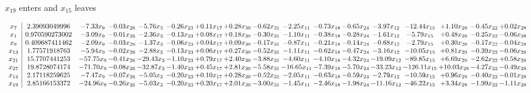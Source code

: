 \documentclass[9pt]{article}
\begin{document}
 $ x_{19} $ enters and $ x_{15} $ leaves 

 \[\begin{array}{c| c c@{\hskip 2pt} c@{\hskip 2pt} c@{\hskip 2pt} c@{\hskip 2pt} c@{\hskip 2pt} c@{\hskip 2pt} c@{\hskip 2pt} c@{\hskip 2pt} c@{\hskip 2pt} c@{\hskip 2pt} c@{\hskip 2pt} c@{\hskip 2pt} c@{\hskip 2pt} c@{\hskip 2pt} c@{\hskip 2pt} }
 x_{7}   &  2.39093049996 & -7.33 x_{9} & -0.03 x_{26} & -5.76 x_{3} & -0.26 x_{23} & +  0.11 x_{17} & +  0.28 x_{30} & -0.62 x_{31} & -2.25 x_{11} & -0.73 x_{18} & -0.65 x_{24} & -3.97 x_{12} & -12.44 x_{15} & +  1.10 x_{29} & -0.45 x_{22} & +  0.02 x_{28}\\
 x_{1}   &  0.970590273002 & -3.09 x_{9} & -0.01 x_{26} & -2.36 x_{3} & -0.13 x_{23} & +  0.08 x_{17} & +  0.18 x_{30} & -0.30 x_{31} & -1.10 x_{11} & -0.38 x_{18} & -0.28 x_{24} & -1.61 x_{12} & -5.79 x_{15} & +  0.48 x_{29} & -0.25 x_{22} & -0.06 x_{28}\\
 x_{8}   &  0.409687411462 & -2.09 x_{9} & -0.03 x_{26} & -1.37 x_{3} & -0.06 x_{23} & +  0.04 x_{17} & +  0.09 x_{30} & -0.17 x_{31} & -0.87 x_{11} & -0.21 x_{18} & -0.14 x_{24} & -0.68 x_{12} & -2.79 x_{15} & +  0.30 x_{29} & -0.17 x_{22} & -0.04 x_{28}\\
 x_{13}   &  1.77571918763 & -5.94 x_{9} & -0.02 x_{26} & -2.88 x_{3} & -0.13 x_{23} & +  0.06 x_{17} & +  0.27 x_{30} & -0.52 x_{31} & -1.11 x_{11} & -0.62 x_{18} & -0.47 x_{24} & -3.16 x_{12} & -10.05 x_{15} & +  0.81 x_{29} & -0.39 x_{22} & -0.06 x_{28}\\
 x_{21}   &  15.7707441253 & -57.75 x_{9} & -0.41 x_{26} & -29.43 x_{3} & -1.10 x_{23} & +  0.79 x_{17} & +  2.40 x_{30} & -3.88 x_{31} & -4.60 x_{11} & -4.10 x_{18} & -4.32 x_{24} & -19.09 x_{12} & -89.85 x_{15} & +  6.69 x_{29} & -2.62 x_{22} & +  0.58 x_{28}\\
 x_{27}   &  19.8728074174 & -71.70 x_{9} & -0.08 x_{26} & -32.87 x_{3} & -1.40 x_{23} & +  0.45 x_{17} & +  2.81 x_{30} & -5.58 x_{31} & -16.65 x_{11} & -7.39 x_{18} & -5.70 x_{24} & -33.23 x_{12} & -126.11 x_{15} & + 10.03 x_{29} & -4.27 x_{22} & -0.49 x_{28}\\
 x_{14}   &  2.17118259625 & -7.47 x_{9} & -0.07 x_{26} & -5.05 x_{3} & -0.20 x_{23} & +  0.10 x_{17} & +  0.28 x_{30} & -0.52 x_{31} & -2.05 x_{11} & -0.63 x_{18} & -0.59 x_{24} & -2.79 x_{12} & -10.59 x_{15} & +  0.96 x_{29} & -0.40 x_{22} & -0.01 x_{28}\\
 x_{19}   &  2.85166153372 & -24.96 x_{9} & -0.26 x_{26} & -5.03 x_{3} & -0.20 x_{23} & +  0.20 x_{17} & +  2.01 x_{30} & -3.00 x_{31} & -1.45 x_{11} & -2.46 x_{18} & -1.98 x_{24} & -11.16 x_{12} & -46.22 x_{15} & +  3.34 x_{29} & -1.99 x_{22} & -1.11 x_{28}\\

\end{array}\]
\end{document}
